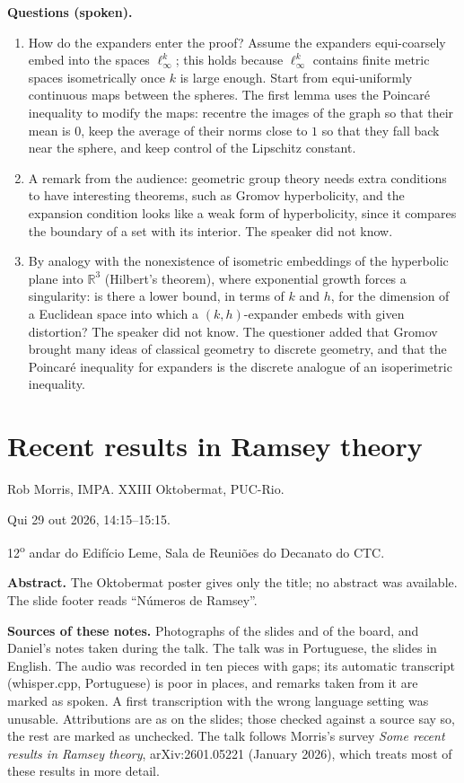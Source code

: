 \medskip\noindent
{\bf Questions (spoken).}
\begin{enumerate}
\item How do the expanders enter the proof?
Assume the expanders equi-coarsely embed
into the spaces $\ell_\infty^{k}$; this holds
because $\ell_\infty^k$ contains finite
metric spaces isometrically once $k$ is
large enough. Start from equi-uniformly
continuous maps between the spheres. The
first lemma uses the Poincaré inequality to
modify the maps: recentre the images of the
graph so that their mean is $0$, keep the
average of their norms close to $1$ so that
they fall back near the sphere, and keep
control of the Lipschitz constant.
\item A remark from the audience: geometric
group theory needs extra conditions to have
interesting theorems, such as Gromov
hyperbolicity, and the expansion condition
looks like a weak form of hyperbolicity,
since it compares the boundary of a set with
its interior. The speaker did not know.
\item By analogy with the nonexistence of
isometric embeddings of the hyperbolic plane
into $\mathbb{R}^3$ (Hilbert's theorem),
where exponential growth forces a
singularity: is there a lower bound, in
terms of $k$ and $h$, for the dimension of a
Euclidean space into which a
$(k,h)$-expander embeds with given
distortion? The speaker did not know. The
questioner added that Gromov brought many
ideas of classical geometry to discrete
geometry, and that the Poincaré inequality
for expanders is the discrete analogue of an
isoperimetric inequality.
\end{enumerate}



\section{Recent results in Ramsey theory}
\label{section-recent-results-ramsey}

\noindent
Rob Morris, IMPA.
XXIII Oktobermat, PUC-Rio.

Qui 29 out 2026, 14:15--15:15.

12\textsuperscript{o} andar do Edif\'icio
Leme, Sala de Reuni\~oes do Decanato do CTC.

\medskip\noindent
{\bf Abstract.} The Oktobermat poster gives
only the title; no abstract was available.
The slide footer reads ``N\'umeros de
Ramsey''.

\medskip\noindent
{\bf Sources of these notes.} Photographs of
the slides and of the board, and Daniel's
notes taken during the talk. The talk was in
Portuguese, the slides in English. The audio
was recorded in ten pieces with gaps; its
automatic transcript (whisper.cpp,
Portuguese) is poor in places, and remarks
taken from it are marked as spoken. A first
transcription with the wrong language setting
was unusable. Attributions are as
on the slides; those checked against a
source say so, the rest are marked as
unchecked. The talk follows Morris's survey
\emph{Some recent results in Ramsey theory},
arXiv:2601.05221 (January 2026), which treats
most of these results in more detail.


